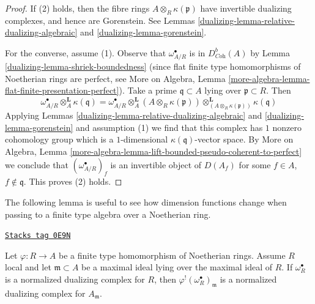 \begin{proof}

If (2) holds, then the fibre rings $A \otimes_R \kappa(\mathfrak p)$
have invertible dualizing complexes, and hence are Gorenstein.
See Lemmas \ref{dualizing-lemma-relative-dualizing-algebraic} and \ref{dualizing-lemma-gorenstein}.

\medskip\noindent
For the converse, assume (1).
Observe that $\omega_{A/R}^\bullet$ is in $D^b_{\textit{Coh}}(A)$
by Lemma \ref{dualizing-lemma-shriek-boundedness} (since flat finite type homomorphisms
of Noetherian rings are perfect, see
More on Algebra, Lemma
\ref{more-algebra-lemma-flat-finite-presentation-perfect}).
Take a prime $\mathfrak q \subset A$ lying over $\mathfrak p \subset R$.
Then
$$
\omega_{A/R}^\bullet \otimes_A^\mathbf{L} \kappa(\mathfrak q) =
\omega_{A/R}^\bullet \otimes_A^\mathbf{L}
(A \otimes_R \kappa(\mathfrak p))
\otimes_{(A \otimes_R \kappa(\mathfrak p))}^\mathbf{L}
\kappa(\mathfrak q)
$$
Applying Lemmas \ref{dualizing-lemma-relative-dualizing-algebraic} and
\ref{dualizing-lemma-gorenstein} and assumption (1) we find that this complex has $1$
nonzero cohomology group which is a $1$-dimensional
$\kappa(\mathfrak q)$-vector space. By
More on Algebra, Lemma
\ref{more-algebra-lemma-lift-bounded-pseudo-coherent-to-perfect}
we conclude that $(\omega_{A/R}^\bullet)_f$ is an invertible
object of $D(A_f)$ for some $f \in A$, $f \not \in \mathfrak q$.
This proves (2) holds.
\end{proof}

The following lemma is useful to see how dimension functions change
when passing to a finite type algebra over a Noetherian ring.

\begin{lemma}
\label{dualizing-lemma-shriek-normalized}
\href{https://stacks.math.columbia.edu/tag/0E9N}{\texttt{Stacks tag 0E9N}}

Let $\varphi : R \to A$ be a finite type homomorphism of Noetherian rings.
Assume $R$ local and let $\mathfrak m \subset A$ be a maximal
ideal lying over the maximal ideal of $R$. If $\omega_R^\bullet$
is a normalized dualizing complex for $R$, then
$\varphi^!(\omega_R^\bullet)_\mathfrak m$ is a normalized
dualizing complex for $A_\mathfrak m$.
\end{lemma}

